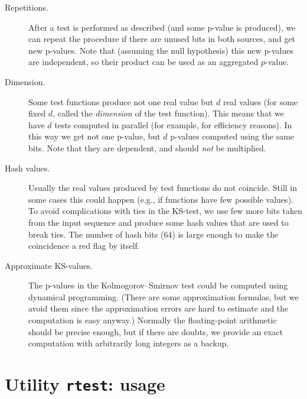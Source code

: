 \documentclass[12pt,a4paper,fullpage]{article}
\begin{document}
\begin{description}

\item[Repetitions.] After a test is performed as described (and some p-value is produced), we can repeat the procedure if there are unused bits in both sources, and get new p-values. Note that (assuming the null hypothesis) this new p-values are independent, so their product can be used as an aggregated $p$-value.

\item[Dimension.]
Some test functions produce not one real value but $d$ real values (for some fixed $d$, called the \emph{dimension} of the test function). This means that we have $d$ tests computed in parallel (for example, for efficiency reasons). In this way we get not one p-value, but $d$ p-values computed using the same bits. Note that they are dependent,  and should \emph{not} be multiplied.

\item[Hash values.]
Usually the real values produced by test functions do not coincide. Still in some cases this could happen (e.g., if functions have few possible values). To avoid complications with ties in the KS-test, we use few more bits taken from the input sequence and produce some hash values that are used to break ties. The number of hash bits ($64$) is large enough to make the coincidence a red flag by itself.

\item[Approximate KS-values.]
The p-values in the Kolmogorov--Smirnov test could be computed using dynamical programming. (There are some approximation formulas, but we avoid them since the approximation errors are hard to estimate and the computation is easy anyway.) Normally the floating-point arithmetic should be precise enough, but if there are doubts, we provide an exact computation with arbitrarily long integers as a backup.
\end{description}

\section{Utility \texttt{rtest}: usage}
\end{document}
